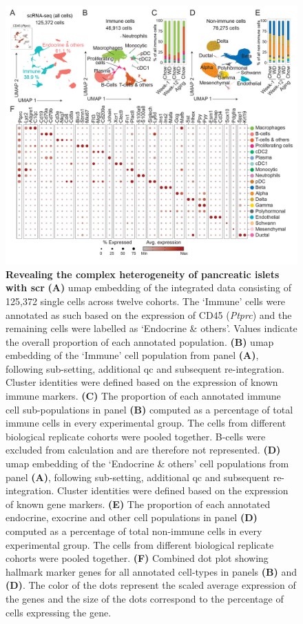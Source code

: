 \begin{figure}[t!]
\centering
\includegraphics[width=\linewidth]{Chapter4/Fig/F2-3-01.png}
\caption[Revealing the complex heterogeneity of pancreatic islets with ]{\textbf{Revealing the complex heterogeneity of pancreatic islets with \gls{scr}} \textbf{(A)} \gls{umap} embedding of the integrated data consisting of 125,372 single cells across twelve cohorts. The `Immune' cells were annotated as such based on the expression of CD45 (\textit{Ptprc}) and the remaining cells were labelled as `Endocrine \& others'. Values indicate the overall proportion of each annotated population. \textbf{(B)} \gls{umap} embedding of the `Immune' cell population from panel \textbf{(A)}, following sub-setting, additional \gls{qc} and subsequent re-integration. Cluster identities were defined based on the expression of known immune markers. \textbf{(C)} The proportion of each annotated immune cell sub-populations in panel \textbf{(B)} computed as a percentage of total immune cells in every experimental group. The cells from different biological replicate cohorts were pooled together. B-cells were excluded from calculation and are therefore not represented. \textbf{(D)} \gls{umap} embedding of the `Endocrine \& others' cell populations from panel \textbf{(A)}, following sub-setting, additional \gls{qc} and subsequent re-integration. Cluster identities were defined based on the expression of known gene markers. \textbf{(E)} The proportion of each annotated endocrine, exocrine and other cell populations in panel \textbf{(D)} computed as a percentage of total non-immune cells in every experimental group. The cells from different biological replicate cohorts were pooled together. \textbf{(F)} Combined dot plot showing hallmark marker genes for all annotated cell-types in panels \textbf{(B)} and \textbf{(D)}. The color of the dots represent the scaled average expression of the genes and the size of the dots correspond to the percentage of cells expressing the gene.}
\label{fig:chp2_fullscRNA}
\end{figure}

